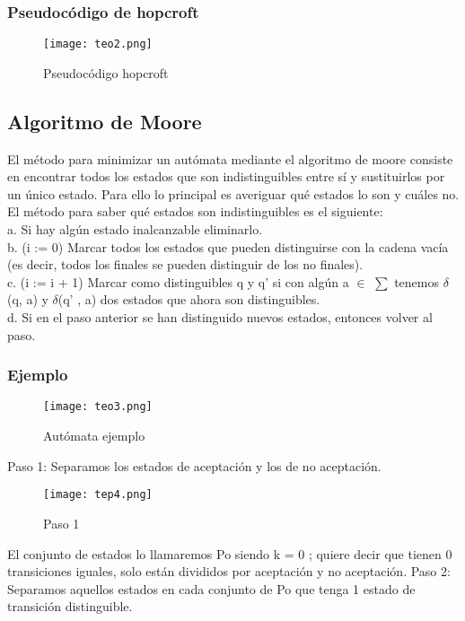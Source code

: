 \documentclass[12pt]{article}
\begin{document}
\subsubsection{Pseudocódigo de hopcroft}
\begin{figure}[h]
    \centering
    \texttt{[image: teo2.png]}
    \caption{Pseudocódigo hopcroft}
    \label{fig:my_label}
\end{figure}

\newpage
\subsection{Algoritmo de Moore}
El m\'etodo para minimizar un aut\'omata mediante el algoritmo de moore consiste en encontrar todos los estados que son indistinguibles entre s\'i y sustituirlos por un \'unico estado. Para ello lo principal es averiguar qu\'e estados lo son y cu\'ales no. El m\'etodo para saber qu\'e estados son indistinguibles es el siguiente: \\
a. Si hay alg\'un estado inalcanzable eliminarlo.\\
b. (i := 0) Marcar todos los estados que pueden distinguirse con la cadena vac\'ia (es decir, todos los finales se pueden distinguir de los no finales).\\
c. (i := i + 1) Marcar como distinguibles q y q' si con alg\'un a $\in$ $\sum$ tenemos $\delta$(q, a) y $\delta$(q' , a) dos estados que ahora son distinguibles.\\ 
d. Si en el paso anterior se han distinguido nuevos estados, entonces volver al paso.\\

\subsubsection{Ejemplo}
\begin{figure}[h]
    \centering
    \texttt{[image: teo3.png]}
    \caption{Aut\'omata ejemplo}
    \label{fig:my_label}
\end{figure}

Paso 1: Separamos los estados de aceptación y los de no aceptación.
\begin{figure}[h]
    \centering
    \texttt{[image: tep4.png]}
    \caption{Paso 1}
    \label{fig:my_label}
\end{figure}

El conjunto de estados lo llamaremos Po siendo k = 0 ; quiere decir que tienen 0 transiciones iguales, solo están divididos por aceptación y no aceptación.
\newpage
Paso 2: Separamos aquellos estados en cada conjunto de Po que tenga 1 estado de transición distinguible.
\end{document}
